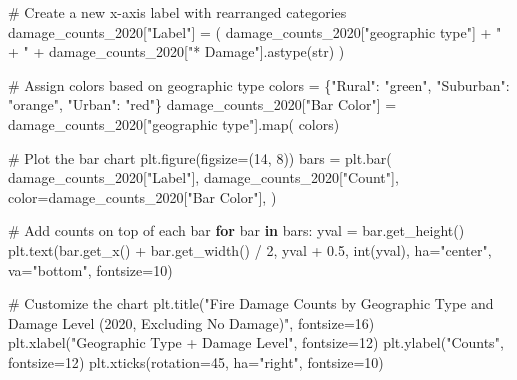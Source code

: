 \documentclass[
  letterpaper,
  DIV=11,
  numbers=noendperiod]{scrartcl}
\newenvironment{Shaded}{\begin{snugshade}}{\end{snugshade}}
\newcommand{\BuiltInTok}[1]{\textcolor[rgb]{0.00,0.23,0.31}{#1}}
\newcommand{\CommentTok}[1]{\textcolor[rgb]{0.37,0.37,0.37}{#1}}
\newcommand{\ControlFlowTok}[1]{\textcolor[rgb]{0.00,0.23,0.31}{\textbf{#1}}}
\newcommand{\DecValTok}[1]{\textcolor[rgb]{0.68,0.00,0.00}{#1}}
\newcommand{\FloatTok}[1]{\textcolor[rgb]{0.68,0.00,0.00}{#1}}
\newcommand{\KeywordTok}[1]{\textcolor[rgb]{0.00,0.23,0.31}{\textbf{#1}}}
\newcommand{\NormalTok}[1]{\textcolor[rgb]{0.00,0.23,0.31}{#1}}
\newcommand{\OperatorTok}[1]{\textcolor[rgb]{0.37,0.37,0.37}{#1}}
\newcommand{\StringTok}[1]{\textcolor[rgb]{0.13,0.47,0.30}{#1}}
\begin{document}
\begin{Shaded}
\begin{Highlighting}[]
\CommentTok{\# Create a new x{-}axis label with rearranged categories}
\NormalTok{damage\_counts\_2020[}\StringTok{"Label"}\NormalTok{] }\OperatorTok{=}\NormalTok{ (}
\NormalTok{    damage\_counts\_2020[}\StringTok{"geographic type"}\NormalTok{] }\OperatorTok{+} \StringTok{" + "} \OperatorTok{+}
\NormalTok{    damage\_counts\_2020[}\StringTok{"* Damage"}\NormalTok{].astype(}\BuiltInTok{str}\NormalTok{)}
\NormalTok{)}

\CommentTok{\# Assign colors based on geographic type}
\NormalTok{colors }\OperatorTok{=}\NormalTok{ \{}\StringTok{"Rural"}\NormalTok{: }\StringTok{"green"}\NormalTok{, }\StringTok{"Suburban"}\NormalTok{: }\StringTok{"orange"}\NormalTok{, }\StringTok{"Urban"}\NormalTok{: }\StringTok{"red"}\NormalTok{\}}
\NormalTok{damage\_counts\_2020[}\StringTok{"Bar Color"}\NormalTok{] }\OperatorTok{=}\NormalTok{ damage\_counts\_2020[}\StringTok{"geographic type"}\NormalTok{].}\BuiltInTok{map}\NormalTok{(}
\NormalTok{    colors)}

\CommentTok{\# Plot the bar chart}
\NormalTok{plt.figure(figsize}\OperatorTok{=}\NormalTok{(}\DecValTok{14}\NormalTok{, }\DecValTok{8}\NormalTok{))}
\NormalTok{bars }\OperatorTok{=}\NormalTok{ plt.bar(}
\NormalTok{    damage\_counts\_2020[}\StringTok{"Label"}\NormalTok{],}
\NormalTok{    damage\_counts\_2020[}\StringTok{"Count"}\NormalTok{],}
\NormalTok{    color}\OperatorTok{=}\NormalTok{damage\_counts\_2020[}\StringTok{"Bar Color"}\NormalTok{],}
\NormalTok{)}

\CommentTok{\# Add counts on top of each bar}
\ControlFlowTok{for}\NormalTok{ bar }\KeywordTok{in}\NormalTok{ bars:}
\NormalTok{    yval }\OperatorTok{=}\NormalTok{ bar.get\_height()}
\NormalTok{    plt.text(bar.get\_x() }\OperatorTok{+}\NormalTok{ bar.get\_width() }\OperatorTok{/} \DecValTok{2}\NormalTok{, yval }\OperatorTok{+} \FloatTok{0.5}\NormalTok{,}
             \BuiltInTok{int}\NormalTok{(yval), ha}\OperatorTok{=}\StringTok{"center"}\NormalTok{, va}\OperatorTok{=}\StringTok{"bottom"}\NormalTok{, fontsize}\OperatorTok{=}\DecValTok{10}\NormalTok{)}

\CommentTok{\# Customize the chart}
\NormalTok{plt.title(}\StringTok{"Fire Damage Counts by Geographic Type and Damage Level (2020, Excluding No Damage)"}\NormalTok{, fontsize}\OperatorTok{=}\DecValTok{16}\NormalTok{)}
\NormalTok{plt.xlabel(}\StringTok{"Geographic Type + Damage Level"}\NormalTok{, fontsize}\OperatorTok{=}\DecValTok{12}\NormalTok{)}
\NormalTok{plt.ylabel(}\StringTok{"Counts"}\NormalTok{, fontsize}\OperatorTok{=}\DecValTok{12}\NormalTok{)}
\NormalTok{plt.xticks(rotation}\OperatorTok{=}\DecValTok{45}\NormalTok{, ha}\OperatorTok{=}\StringTok{"right"}\NormalTok{, fontsize}\OperatorTok{=}\DecValTok{10}\NormalTok{)}


\end{Highlighting}
\end{Shaded}
\end{document}
